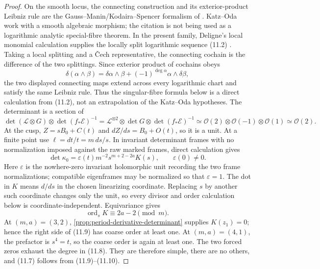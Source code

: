 \begin{proof}
On the smooth locus, the connecting construction and its
exterior-product Leibniz rule are the Gauss--Manin/Kodaira--Spencer
formalism of
\cite[\S2, equations~(5)--(10), pp.~202--204]{KatzOda1968}.
Katz--Oda work with a smooth algebraic morphism; the citation is not being
used as a logarithmic analytic special-fibre theorem.  In the present family,
Deligne's local monomial calculation supplies the locally split logarithmic
sequence (11.2) \cite[Chapter~II, \S3.3]{Deligne1970}.  Taking a local
splitting and a \v Cech representative, the connecting cochain is the
difference of the two splittings.  Since exterior product of cochains obeys
\[
 \delta(\alpha\wedge\beta)
 =\delta\alpha\wedge\beta+(-1)^{\deg\alpha}
   \alpha\wedge\delta\beta,
\]
the two displayed connecting maps extend across every logarithmic chart and
satisfy the same Leibniz rule.  Thus the singular-fibre formula below is a
direct calculation from (11.2), not an extrapolation of the Katz--Oda
hypotheses.
The determinant is a section of
\[
 \det(\mathcal L\otimes G)\otimes\det(f_*\mathcal E)^{-1}
 =\mathcal L^{\otimes2}\otimes\det G
   \otimes\det(f_*\mathcal E)^{-1}
 \simeq\mathcal O(2)\otimes\mathcal O(-1)\otimes\mathcal O(1)
 \simeq\mathcal O(2).
\tag{11.8}
\]
At the cusp, $Z=sB_0+C(t)$ and $dZ/ds=B_0+O(t)$, so it is a unit.  At a
finite point use $\ell=dt/t=m\,ds/s$.  In invariant determinant frames
with no normalization imposed against the raw marked frames, direct
calculation gives
\[
 \det\kappa_0
 =\varepsilon(t)m^{-2}s^{m+2-2a}K(s),
 \qquad \varepsilon(0)\ne0.
\tag{11.9}
\]
Here $\varepsilon$ is the nowhere-zero invariant holomorphic unit recording the two
frame normalizations; compatible eigenframes may be normalized so that
$\varepsilon=1$.  The dot in $K$ means $d/ds$ in the chosen linearizing coordinate.
Replacing $s$ by another such coordinate changes only the unit, so every
divisor and order calculation below is coordinate-independent.
Equivariance gives
\[
 \operatorname{ord}_sK\equiv2a-2\pmod m.
\tag{11.10}
\]
At $(m,a)=(3,2)$, 
\cref{prop:period-derivative-determinant} supplies $K(z_1)=0$; hence the
right side of (11.9) has coarse order at least one.  At $(m,a)=(4,1)$,
the prefactor is $s^4=t$, so the coarse order is again at least one.
The two forced zeros exhaust the degree in (11.8).  They are therefore
simple, there are no others, and (11.7) follows from (11.9)--(11.10).


\end{proof}

